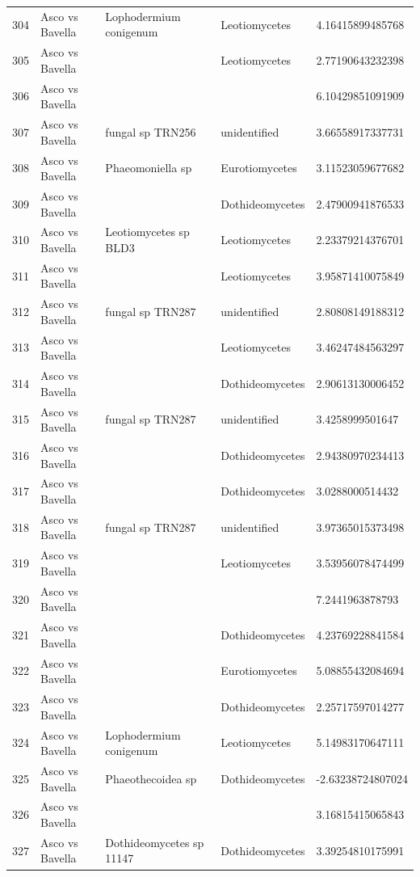 \documentclass[12pt]{article}\usepackage[]{graphicx}\usepackage[]{color}
\numberwithin{figure}{section}
\begin{document}
\begin{table}[ht]
\begin{tabular}{lllll}
  304 & Asco vs Bavella & Lophodermium conigenum & Leotiomycetes & 4.16415899485768 \\ 
  305 & Asco vs Bavella &  & Leotiomycetes & 2.77190643232398 \\ 
  306 & Asco vs Bavella &  &  & 6.10429851091909 \\ 
  307 & Asco vs Bavella & fungal sp TRN256 & unidentified & 3.66558917337731 \\ 
  308 & Asco vs Bavella & Phaeomoniella sp & Eurotiomycetes & 3.11523059677682 \\ 
  309 & Asco vs Bavella &  & Dothideomycetes & 2.47900941876533 \\ 
  310 & Asco vs Bavella & Leotiomycetes sp BLD3 & Leotiomycetes & 2.23379214376701 \\ 
  311 & Asco vs Bavella &  & Leotiomycetes & 3.95871410075849 \\ 
  312 & Asco vs Bavella & fungal sp TRN287 & unidentified & 2.80808149188312 \\ 
  313 & Asco vs Bavella &  & Leotiomycetes & 3.46247484563297 \\ 
  314 & Asco vs Bavella &  & Dothideomycetes & 2.90613130006452 \\ 
  315 & Asco vs Bavella & fungal sp TRN287 & unidentified & 3.4258999501647 \\ 
  316 & Asco vs Bavella &  & Dothideomycetes & 2.94380970234413 \\ 
  317 & Asco vs Bavella &  & Dothideomycetes & 3.0288000514432 \\ 
  318 & Asco vs Bavella & fungal sp TRN287 & unidentified & 3.97365015373498 \\ 
  319 & Asco vs Bavella &  & Leotiomycetes & 3.53956078474499 \\ 
  320 & Asco vs Bavella &  &  & 7.2441963878793 \\ 
  321 & Asco vs Bavella &  & Dothideomycetes & 4.23769228841584 \\ 
  322 & Asco vs Bavella &  & Eurotiomycetes & 5.08855432084694 \\ 
  323 & Asco vs Bavella &  & Dothideomycetes & 2.25717597014277 \\ 
  324 & Asco vs Bavella & Lophodermium conigenum & Leotiomycetes & 5.14983170647111 \\ 
  325 & Asco vs Bavella & Phaeothecoidea sp & Dothideomycetes & -2.63238724807024 \\ 
  326 & Asco vs Bavella &  &  & 3.16815415065843 \\ 
  327 & Asco vs Bavella & Dothideomycetes sp 11147 & Dothideomycetes & 3.39254810175991 \\ 

\end{tabular}
\end{table}
\end{document}
